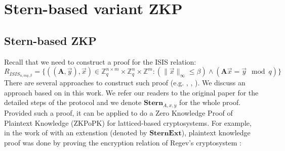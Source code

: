 

\section{Stern-based variant ZKP}
\label{sec:firstProcZKP}
\subsection{Stern-based ZKP}
\label{sec:Stern-basedZKP}
Recall that we need to construct a proof for the ISIS relation:
\[
  R_{ISIS_{n,mq,\beta}} = \{ ((\mathbf{A},\vec{y}),\vec{x})
  \in \mathbb{Z}_q^{n\times m} \times \mathbb{Z}_q^n
  \times \mathbb{Z}^m: (\|\vec{x}\|_\infty \leq \beta) \land
  (\mathbf{A}\vec{x} = \vec{y} \mod q) \}
\]
There are several approaches to construct such proof (e.g. \cite{lyubashevsky2008lattice},
\cite{micciancio2003statistical}, \cite{stern1993new}). We discuss an approach based on \cite{stern1993new} in this
work. We refer our readers to the original paper for the detailed steps of the protocol and we denote
\(\mathbf{Stern}_{A,x,y}\) for the whole proof. Provided such a proof, it can be applied to do a Zero Knowledge Proof of
Plaintext Knowledge (ZKPoPK) for latticed-based cryptosystems. For example, in the work of \cite{ling2013improved} with
an extenstion (denoted by \(\mathbf{SternExt}\)), plaintext knowledge proof was done by proving the encryption relation
of Regev's cryptosystem \cite{regev2009lattices}:

